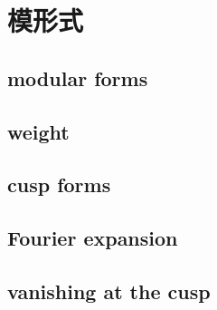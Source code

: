 \section{模形式}
\label{b3:sec:2303}


\subsection{modular forms}
\label{b3:subsec:230301}

\subsection{weight}
\label{b3:subsec:230302}

\subsection{cusp forms}
\label{b3:subsec:230303}

\subsection{Fourier expansion}
\label{b3:subsec:230304}

\subsection{vanishing at the cusp}
\label{b3:subsec:230305}


